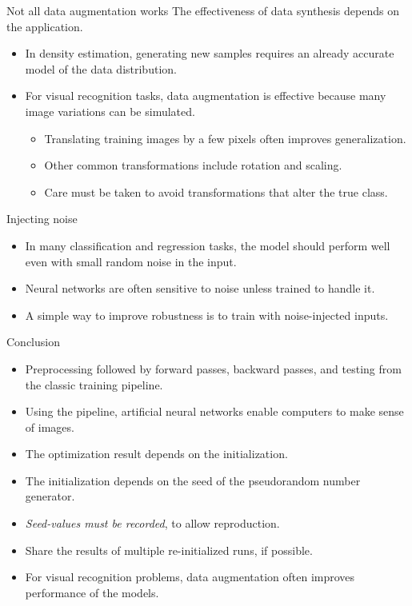 \documentclass{beamer}
\begin{document}
\begin{frame}{Not all data augmentation works}
    The effectiveness of data synthesis depends on the application.
    \begin{itemize}
        \item In density estimation, generating new samples requires an already accurate model of the data distribution.
        \item For visual recognition tasks, data augmentation is effective because many image variations can be simulated.
        \begin{itemize}
            \item Translating training images by a few pixels often improves generalization.
            \item Other common transformations include rotation and scaling.
            \item Care must be taken to avoid transformations that alter the true class.
        \end{itemize}
    \end{itemize}
\end{frame}

\begin{frame}{Injecting noise}
\begin{itemize}
    \item In many classification and regression tasks, the model should perform well even with small random noise in the input.  
    \item Neural networks are often sensitive to noise unless trained to handle it.  
    \item A simple way to improve robustness is to train with noise-injected inputs.  
\end{itemize}
\end{frame}

    \begin{frame}{Conclusion}
      \begin{itemize}
        \item Preprocessing followed by forward passes, backward passes, and testing from the classic training pipeline.
        \item Using the pipeline, artificial neural networks enable computers to make sense of images.
        \item The optimization result depends on the initialization.
        \item The initialization depends on the seed of the pseudorandom number generator.
        \item \textit{Seed-values must be recorded}, to allow reproduction.
        \item Share the results of multiple re-initialized runs, if possible.
				\item For visual recognition problems, data augmentation often improves performance of the models.
      \end{itemize}
    \end{frame}
\end{document}
